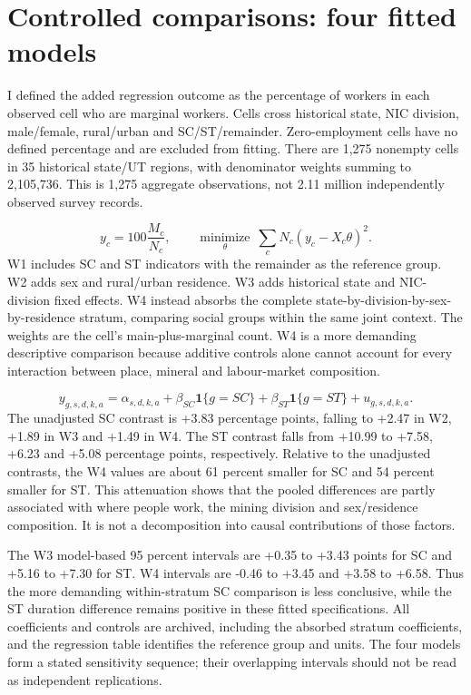 \documentclass[11pt,a4paper]{report}
\begin{document}
\section{Controlled comparisons: four fitted models}
I defined the added regression outcome as the percentage of workers in each observed cell who are marginal workers. Cells cross historical state, NIC division, male/\allowbreak{}female, rural/\allowbreak{}urban and SC/\allowbreak{}ST/\allowbreak{}remainder. Zero-employment cells have no defined percentage and are excluded from fitting. There are 1,275 nonempty cells in 35 historical state/\allowbreak{}UT regions, with denominator weights summing to 2,105,736. This is 1,275 aggregate observations, not 2.11 million independently observed survey records.

\[
y_c=100\frac{M_c}{N_c},\qquad
\underset{\theta}{\operatorname{minimize}}\ \sum_c N_c(y_c-X_c\theta)^2.
\]
W1 includes SC and ST indicators with the remainder as the reference group. W2 adds sex and rural/\allowbreak{}urban residence. W3 adds historical state and NIC-division fixed effects. W4 instead absorbs the complete state-by-division-by-sex-by-residence stratum, comparing social groups within the same joint context. The weights are the cell's main-plus-marginal count. W4 is a more demanding descriptive comparison because additive controls alone cannot account for every interaction between place, mineral and labour-market composition.

\[
y_{g,s,d,k,a}=\alpha_{s,d,k,a}
 +\beta_{SC}\mathbf{1}\{g=SC\}
 +\beta_{ST}\mathbf{1}\{g=ST\}+u_{g,s,d,k,a}.
\]
The unadjusted SC contrast is +3.83 percentage points, falling to +2.47 in W2, +1.89 in W3 and +1.49 in W4. The ST contrast falls from +10.99 to +7.58, +6.23 and +5.08 percentage points, respectively. Relative to the unadjusted contrasts, the W4 values are about 61 percent smaller for SC and 54 percent smaller for ST. This attenuation shows that the pooled differences are partly associated with where people work, the mining division and sex/\allowbreak{}residence composition. It is not a decomposition into causal contributions of those factors.

The W3 model-based 95 percent intervals are +0.35 to +3.43 points for SC and +5.16 to +7.30 for ST. W4 intervals are -0.46 to +3.45 and +3.58 to +6.58. Thus the more demanding within-stratum SC comparison is less conclusive, while the ST duration difference remains positive in these fitted specifications. All coefficients and controls are archived, including the absorbed stratum coefficients, and the regression table identifies the reference group and units. The four models form a stated sensitivity sequence; their overlapping intervals should not be read as independent replications.
\end{document}
